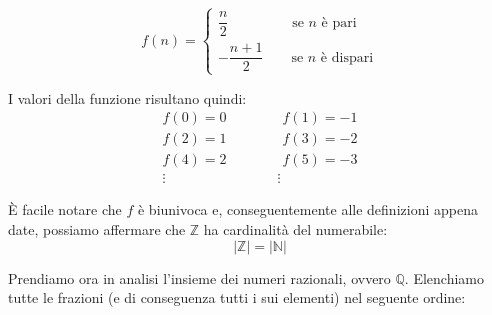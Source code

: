 \begin{equation*}
	f(n) =
	\begin{cases}
		\dfrac{n}{2} \qquad \qquad \;\; \text{se $n$ è pari}\\
		-\dfrac{n+1}{2} \qquad \text{se $n$ è dispari}
	\end{cases}
\end{equation*}

I valori della funzione risultano quindi:
\begin{align*}
    f(0) = 0 \qquad \qquad f(1) = -1\\
    f(2) = 1 \qquad \qquad f(3) = -2\\
    f(4) = 2 \qquad \qquad f(5) = -3\\
    \vdots \qquad \qquad \qquad \qquad \vdots \qquad
\end{align*}

È facile notare che $f$ è biunivoca e, conseguentemente alle definizioni appena date, possiamo affermare che $\mathbb{Z}$ ha cardinalità del numerabile:
\begin{equation*}
    |\mathbb{Z}| = |\mathbb{N}|
\end{equation*}

Prendiamo ora in analisi l'insieme dei numeri razionali, ovvero $\mathbb{Q}$. Elenchiamo tutte le frazioni (e di conseguenza tutti i sui elementi) nel seguente ordine:

